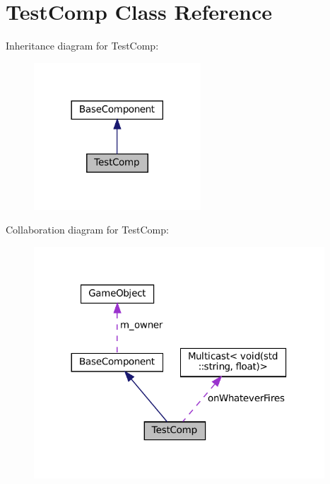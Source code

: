 \hypertarget{classTestComp}{}\section{Test\+Comp Class Reference}
\label{classTestComp}


Inheritance diagram for Test\+Comp\+:\nopagebreak
\begin{figure}[H]
\begin{center}
\leavevmode
\includegraphics[width=177pt]{classTestComp__inherit__graph}
\end{center}
\end{figure}


Collaboration diagram for Test\+Comp\+:\nopagebreak
\begin{figure}[H]
\begin{center}
\leavevmode
\includegraphics[width=308pt]{classTestComp__coll__graph}
\end{center}
\end{figure}
